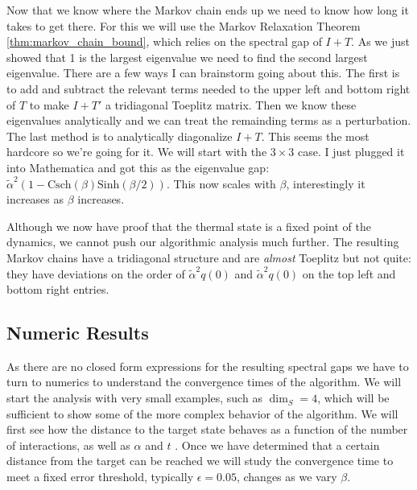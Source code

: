 \documentclass{article}
\begin{document}
Now that we know where the Markov chain ends up we need to know how long it takes to get there. For this we will use the Markov Relaxation Theorem \ref{thm:markov_chain_bound}, which relies on the spectral gap of $I + T$. As we just showed that 1 is the largest eigenvalue we need to find the second largest eigenvalue. There are a few ways I can brainstorm going about this. The first is to add and subtract the relevant terms needed to the upper left and bottom right of $T$ to make $I + T'$ a tridiagonal Toeplitz matrix. Then we know these eigenvalues analytically and we can treat the remainding terms as a perturbation. The last method is to analytically diagonalize $I + T$. This seems the most hardcore so we're going for it.
We will start with the $3 \times 3$ case. I just plugged it into Mathematica and got this as the eigenvalue gap: $\widetilde{\alpha}^2\left(1 - \text{Csch}(\beta) \text{Sinh}(\beta / 2) \right)$. This now scales with $\beta$, interestingly it increases as $\beta$ increases. 

Although we now have proof that the thermal state is a fixed point of the dynamics, we cannot push our algorithmic analysis much further. The resulting Markov chains have a tridiagonal structure and are \emph{almost} Toeplitz but not quite: they have deviations on the order of $\widetilde{\alpha}^2 q(0)$ and $\widetilde{\alpha}^2 q(0)$ on the top left and bottom right entries. 

\subsection{Numeric Results}
As there are no closed form expressions for the resulting spectral gaps we have to turn to numerics to understand the convergence times of the algorithm. We will start the analysis with very small examples, such as $\dim_S = 4$, which will be sufficient to show some of the more complex behavior of the algorithm. We will first see how the distance to the target state behaves as a function of the number of interactions, as well as $\alpha$ and $t$ . Once we have determined that a certain distance from the target can be reached we will study the convergence time to meet a fixed error threshold, typically $\epsilon = 0.05$, changes as we vary $\beta$. 
\end{document}
